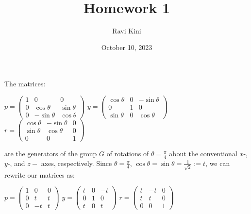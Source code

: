 \documentclass{article}
\title{Homework 1}
\author{Ravi Kini}
\date{October 10, 2023}
\begin{document}
\maketitle

\problem
{}
The matrices:
\begin{center}
    $p = 
    \begin{pmatrix} 
        1 & 0 & 0 \\
        0 & \cos\theta & \sin\theta  \\
        0 & -\sin\theta & \cos\theta
    \end{pmatrix}$
    \hspace{.25in}
    $y = 
    \begin{pmatrix} 
        \cos\theta & 0 & -\sin\theta \\
        0 & 1 &  0 \\
        \sin\theta & 0 & \cos\theta
    \end{pmatrix}$
    \hspace{.25in}
    $r = 
    \begin{pmatrix} 
        \cos\theta & -\sin\theta & 0 \\
        \sin\theta & \cos\theta  & 0 \\
        0 & 0 & 1
    \end{pmatrix}
    $
\end{center}
are the generators of the group $G$ of rotations of $\theta = \frac{\pi}{4}$ about the conventional $x$-, $y$-, and $z-$ axes, respectively. Since $\theta = \frac{\pi}{4}$, $\cos \theta = \sin \theta = \frac{1}{\sqrt{2}} := t$, we can rewrite our matrices as:
\begin{center}
    $p = 
    \begin{pmatrix} 
        1 & 0 & 0 \\
        0 & t & t  \\
        0 & -t & t
    \end{pmatrix}$
    \hspace{.25in}
    $y = 
    \begin{pmatrix} 
        t & 0 & -t \\
        0 & 1 &  0 \\
        t & 0 & t
    \end{pmatrix}$
    \hspace{.25in}
    $r = 
    \begin{pmatrix} 
        t & -t & 0 \\
        t  & t  & 0 \\
        0 & 0 & 1
    \end{pmatrix}
    $
\end{center}
\end{document}
